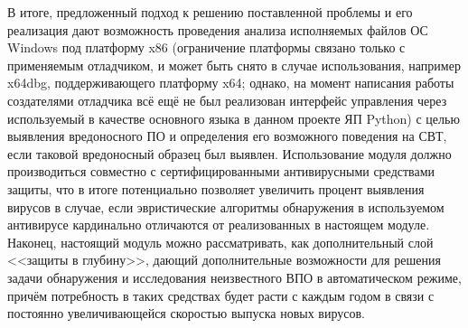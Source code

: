 В итоге, предложенный подход к решению поставленной проблемы и его реализация дают возможность проведения анализа исполняемых файлов ОС Windows под платформу x86 (ограничение платформы связано только с применяемым отладчиком, и может быть снято в случае использования, например x64dbg, поддерживающего платформу x64; однако, на момент написания работы создателями отладчика всё ещё не был реализован интерфейс управления через используемый в качестве основного языка в данном проекте ЯП Python) с целью выявления вредоносного ПО и определения его возможного поведения на СВТ, если таковой вредоносный образец был выявлен. Использование модуля должно производиться совместно с сертифицированными антивирусными средствами защиты, что в итоге потенциально позволяет увеличить процент выявления вирусов в случае, если эвристические алгоритмы обнаружения в используемом антивирусе кардинально отличаются от реализованных в настоящем модуле. Наконец, настоящий модуль можно рассматривать, как дополнительный слой <<защиты в глубину>>, дающий дополнительные возможности для решения задачи обнаружения и исследования неизвестного ВПО в автоматическом режиме, причём потребность в таких средствах будет расти с каждым годом в связи с постоянно увеличивающейся скоростью выпуска новых вирусов.